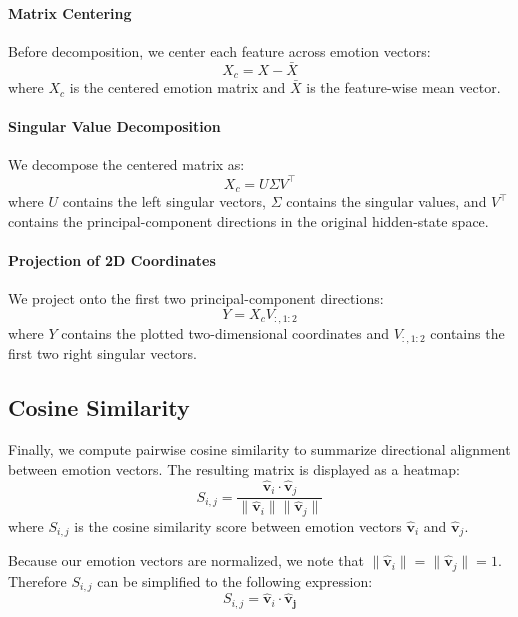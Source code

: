 \paragraph{Matrix Centering} Before decomposition, we center each feature across emotion vectors:
\begin{equation}
    X_c = X - \bar{X}
    \label{eqtn:pca-centering}
\end{equation}
where $X_c$ is the centered emotion matrix and $\bar{X}$ is the feature-wise mean vector.

\paragraph{Singular Value Decomposition} We decompose the centered matrix as:
\begin{equation}
    X_c=U\Sigma V^{\top}
    \label{eqtn:pca-svd}
\end{equation}
where $U$ contains the left singular vectors, $\Sigma$ contains the singular values, and $V^{\top}$ contains the
principal-component directions in the original hidden-state space.

\paragraph{Projection of 2D Coordinates} We project onto the first two principal-component directions:
\begin{equation}
    Y = X_c V_{:,1:2}
    \label{eqtn:pca-proj}
\end{equation}
where $Y$ contains the plotted two-dimensional coordinates and $V_{:,1:2}$ contains the first two right singular vectors.

\subsection{Cosine Similarity}

Finally, we compute pairwise cosine similarity to summarize directional alignment between emotion vectors. The resulting
matrix is displayed as a heatmap:
\begin{equation}
    S_{i,j}=\frac{\mathbf{\hat{v}}_i\cdot \mathbf{\hat{v}}_j}{\lVert \mathbf{\hat{v}}_i \rVert \lVert \mathbf{\hat{v}}_j \rVert}
    \label{eqtn:cos-similarity}
\end{equation}
where $S_{i,j}$ is the cosine similarity score between emotion vectors $\mathbf{\hat{v}}_i$ and $\mathbf{\hat{v}}_j$.

Because our emotion vectors are normalized, we note that $\lVert \mathbf{\hat{v}}_i \rVert=\lVert \mathbf{\hat{v}}_j \rVert=1$. 
Therefore $S_{i,j}$ can be simplified to the following expression:
\begin{equation}
    S_{i,j}=\mathbf{\hat{v}}_i\cdot \mathbf{\hat{v}_j}
    \label{eqtn:cos-sim-reduced}
\end{equation}
